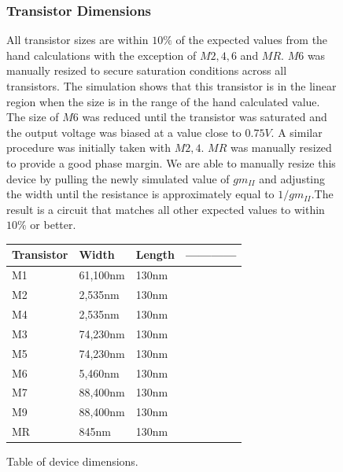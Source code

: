 \documentclass[]{article}
\begin{document}
		\begin{center}
			\begin{figure}
				\subsubsection{Transistor Dimensions}
				All transistor sizes are within $10\%$ of the expected values from the hand calculations with the exception of $M2,4,6$ and $MR$. $M6$ was manually resized to secure saturation conditions across all transistors. The simulation shows that this transistor is in the linear region when the size is in the range of the hand calculated value. The size of $M6$ was reduced until the transistor was saturated and the output voltage was biased at a value close to $0.75V$. A similar procedure was initially taken with $M2,4$. $MR$ was manually resized to provide a good phase margin. We are able to manually resize this device by pulling the newly simulated value of $gm_{II}$ and adjusting the width until the resistance is approximately equal to $1/gm_{II}$.The result is a circuit that matches all other expected values to within $10\%$ or better.
				$$$$
				
  				\begin{tabular}{ | l | l | l | p{5cm} |}
   			 		\hline
   			 		Transistor & Width & Length &------------\\ \hline
   			 		M1 & 61,100nm & 130nm & \\ \hline
    					M2 & 2,535nm & 130nm & \\ \hline
    					M4 & 2,535nm & 130nm & \\ \hline
					M3 & 74,230nm & 130nm & \\ \hline
					M5 & 74,230nm & 130nm & \\ \hline
					M6 & 5,460nm & 130nm & \\ \hline
					M7 & 88,400nm & 130nm & \\ \hline
					M9 & 88,400nm & 130nm & \\ \hline
					MR & 845nm & 130nm & \\ \hline				
	  			  	\end{tabular}
			\caption{Table of device dimensions.}
			\end{figure}
			\end{center}
			\newpage
			
\end{document}
